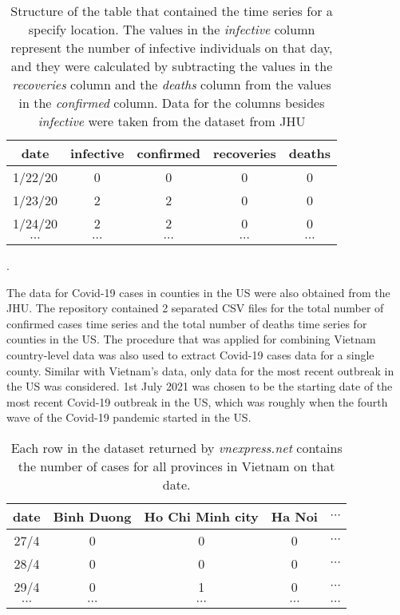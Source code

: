 \begin{table}[h]
\centering
\begin{tabular}{| c | c | c | c | c |}
    date & infective & confirmed & recoveries & deaths \\
    \hline\hline
    1/22/20 & 0 & 0 & 0 & 0 \\
    \hline
    1/23/20 & 2 & 2 & 0 & 0 \\
    \hline
    1/24/20 & 2 & 2 & 0 & 0 \\
    \hline
    $\cdots$ & $\cdots$ & $\cdots$ & $\cdots$ & $\cdots$ \\
\end{tabular}
\caption[Combined Covid-19 dataset structure]{Structure of the table that contained the time series for a specify location. The values in the \textit{infective} column represent the number of infective individuals on that day, and they were calculated by subtracting the values in the \textit{recoveries} column and the \textit{deaths} column from the values in the \textit{confirmed} column. Data for the columns besides \textit{infective} were taken from the dataset from JHU \cite{dongInteractiveWebbasedDashboard2020}}.
\label{tab:country-covid-timeseries}
\end{table}

The data for Covid-19 cases in counties in the \gls{US} were also obtained from the \gls{JHU}.
The repository contained 2 separated CSV files for the total number of confirmed cases time series and the total number of deaths time series for counties in the \gls{US}.
The procedure that was applied for combining Vietnam country-level data was also used to extract Covid-19 cases data for a single county.
Similar with Vietnam's data, only data for the most recent outbreak in the \gls{US} was considered.
1st July 2021 was chosen to be the starting date of the most recent Covid-19 outbreak in the US, which was roughly when the fourth wave of the Covid-19 pandemic started in the \gls{US}.

\begin{table}[h]
\centering
\begin{tabular}{|c | c | c | c | c }
    date & Binh Duong & Ho Chi Minh city & Ha Noi & $\cdots$ \\
    \hline\hline
    27/4 & 0 & 0 & 0 & $\cdots$ \\
    \hline
    28/4 & 0 & 0 & 0 & $\cdots$ \\
    \hline
    29/4 & 0 & 1 & 0 & $\cdots$ \\
    \hline
    $\cdots$ & $\cdots$ & $\cdots$ & $\cdots$ & $\cdots$ \\
\end{tabular}
\caption[VnExpress Covid-19 dataset structure]{Each row in the dataset returned by \textit{vnexpress.net} contains the number of cases for all provinces in Vietnam on that date.}
\label{tab:vietnam-provinces-timeseries}
\end{table}

